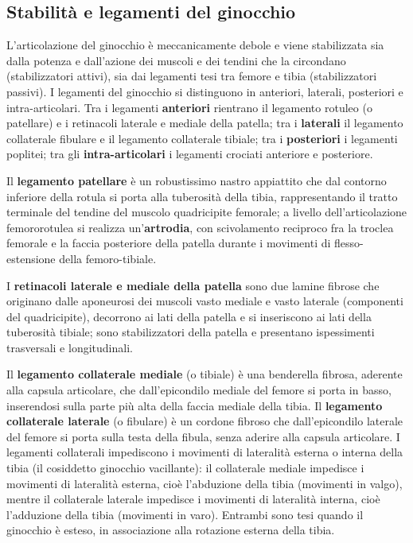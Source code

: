 \subsection{Stabilità e legamenti del ginocchio}

L'articolazione del ginocchio è meccanicamente debole e viene
stabilizzata sia dalla potenza e dall'azione dei muscoli e dei tendini che
la circondano (stabilizzatori attivi), sia dai legamenti tesi tra femore e
tibia (stabilizzatori passivi). I legamenti del ginocchio si distinguono
in anteriori, laterali, posteriori e intra-articolari. Tra i legamenti
\textbf{anteriori} rientrano il legamento rotuleo (o patellare) e i
retinacoli laterale e mediale della patella; tra i \textbf{laterali} il
legamento collaterale fibulare e il legamento collaterale tibiale; tra i
\textbf{posteriori} i legamenti poplitei; tra gli
\textbf{intra-articolari} i legamenti crociati anteriore e posteriore.

Il \textbf{legamento patellare} è un robustissimo nastro appiattito che dal
contorno inferiore della rotula si porta alla tuberosità della tibia,
rappresentando il tratto terminale del tendine del muscolo quadricipite
femorale; a livello dell'articolazione femororotulea si realizza
un'\textbf{artrodia}, con scivolamento reciproco fra la troclea femorale e
la faccia posteriore della patella durante i movimenti di
flesso-estensione della femoro-tibiale.

I \textbf{retinacoli laterale e mediale della patella} sono due lamine
fibrose che originano dalle aponeurosi dei muscoli vasto mediale e vasto
laterale (componenti del quadricipite), decorrono ai lati della patella e
si inseriscono ai lati della tuberosità tibiale; sono stabilizzatori della
patella e presentano ispessimenti trasversali e longitudinali.

Il \textbf{legamento collaterale mediale} (o tibiale) è una benderella
fibrosa, aderente alla capsula articolare, che dall'epicondilo mediale del
femore si porta in basso, inserendosi sulla parte più alta della faccia
mediale della tibia. Il \textbf{legamento collaterale laterale} (o
fibulare) è un cordone fibroso che dall'epicondilo laterale del femore si
porta sulla testa della fibula, senza aderire alla capsula articolare. I
legamenti collaterali impediscono i movimenti di lateralità esterna o
interna della tibia (il cosiddetto ginocchio vacillante): il collaterale
mediale impedisce i movimenti di lateralità esterna, cioè l'abduzione
della tibia (movimenti in valgo), mentre il collaterale laterale impedisce
i movimenti di lateralità interna, cioè l'adduzione della tibia
(movimenti in varo). Entrambi sono tesi quando il ginocchio è esteso, in
associazione alla rotazione esterna della tibia.

